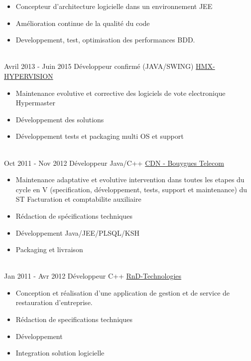 \documentclass[letterpaper]{twentysecondcv} %
\begin{document}
\begin{twenty}
{{\begin{itemize}
     		des complements securitaires et d'integration au SI existant (Active Directory).
     		\item Concepteur d'architecture logicielle dans un environnement JEE
     		\item Amélioration continue de la qualité du code
     		\item Developpement, test, optimisation des performances BDD.
    	\end{itemize}}
        }
     \\
     \twentyitem
   		{Avril 2013 -}
		{Juin 2015}
        {Développeur confirmé (JAVA/SWING)}
        {\href{}{HMX-HYPERVISION}}
        {}
        {
        \begin{itemize}
        	\item Maintenance evolutive et corrective des logiciels de vote electronique Hypermaster
        	\item Développement des solutions
        	\item Développement tests et packaging multi OS et support
    	\end{itemize}
    	}
        
       \\
    \twentyitem
    {Oct 2011 -}
    {Nov 2012}
    {Développeur Java/C++}
    {\href{https://www.jobs.bouyguestelecom.fr/}{CDN - Bouygues Telecom}}
    {}
    {
        \begin{itemize}
        	\item Maintenance adaptative et evolutive intervention dans toutes les etapes du cycle en V (specification, développement, tests, support et maintenance) du ST Facturation et comptabilite auxiliaire
        	\item Rédaction de spécifications techniques
        	\item Développement Java/JEE/PLSQL/KSH
        	\item Packaging et livraison	
        \end{itemize}
    }
    
           \\
    \twentyitem
    {Jan 2011 -}
    {Avr 2012}
    {Développeur C++}
    {\href{}{RnD-Technologies}}
    {}
    {
    	\begin{itemize}
		\item Conception et réalisation d'une application de gestion et de service de restauration d'entreprise.
		\item Rédaction de specifications techniques
		\item Développement
		\item Integration solution logicielle	
    	\end{itemize}
    }


\end{twenty}
\end{document}
